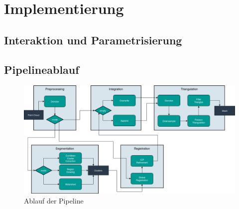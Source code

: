 
\chapter{Implementierung}
\label{ch:implementierung}


\section{Interaktion und Parametrisierung}
\label{sec:interaktion}


\section{Pipelineablauf}
\label{sec:pipeline}

\begin{figure}[ht]
    \centering
	\includegraphics[width=\textwidth]{images/pipeline.png}
	\caption{Ablauf der Pipeline}
	\label{fig:pipeline}
\end{figure}

